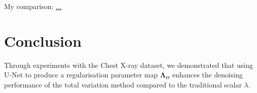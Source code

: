 \documentclass[12pt]{article}
\begin{document}
My comparison: \url{...}



\section{Conclusion}


Through experiments with the Chest X-ray dataset, we demonstrated that using U-Net to produce a regularisation parameter map $\mathbf{\Lambda}_{\Theta}$ enhances the denoising performance of the total variation method compared to the traditional scalar $\lambda$.





\end{document}
